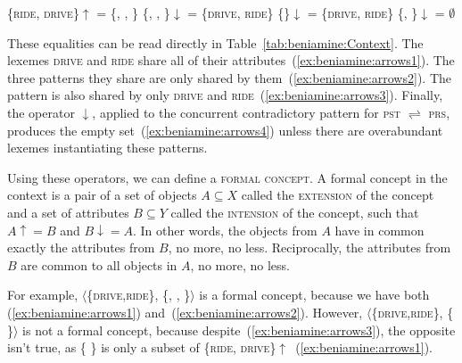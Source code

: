 \documentclass[output=paper]{langscibook}
\begin{document}
    \begin{exe}
        \ex \label{ex:beniamine:arrows1} \{\textsc{ride}, \textsc{drive}\}$\uparrow$ = \{, , \}
        \ex \label{ex:beniamine:arrows2} \{, , \}$\downarrow$ = \{\textsc{drive}, \textsc{ride}\}
        \ex \label{ex:beniamine:arrows3} \{\}$\downarrow$ = \{\textsc{drive}, \textsc{ride}\}
        \ex \label{ex:beniamine:arrows4} \{, \}$\downarrow$ = $\emptyset$
    \end{exe}
    
    These equalities can be read directly in Table~\ref{tab:beniamine:Context}. The lexemes  \textsc{drive} and \textsc{ride} share all of their attributes~(\ref{ex:beniamine:arrows1}). The three patterns they share are only shared by them~(\ref{ex:beniamine:arrows2}). The pattern  is also shared by only \textsc{drive} and \textsc{ride}~(\ref{ex:beniamine:arrows3}). Finally, the operator $\downarrow$, applied to the concurrent contradictory pattern for \textsc{pst} $\rightleftharpoons$ \textsc{prs}, produces the empty set~(\ref{ex:beniamine:arrows4}) unless there are overabundant lexemes instantiating these patterns.
    
    Using these operators, we can define a \textsc{formal concept}. A formal concept in the context \context{} is a pair \concept{} of a set of objects $A \subseteq X$ called the \textsc{extension} of the concept and a set of attributes $B \subseteq Y$ called the \textsc{intension} of the concept, such that $A\uparrow = B$ and $B\downarrow = A$. In other words, the objects from $A$ have in common exactly the attributes from $B$, no more, no less. Reciprocally, the attributes from $B$ are common to all objects in $A$, no more, no less.
    
    \begin{sloppypar}
      For example, $\langle$\{\textsc{drive},\textsc{ride}\},
      \{, ,
       \}$\rangle$ is a formal concept,
      because we have both (\ref{ex:beniamine:arrows1})
      and~(\ref{ex:beniamine:arrows2}). However,
      $\langle$\{\textsc{drive},\textsc{ride}\}, \{ \}$\rangle$ is not a formal concept, because
      despite~(\ref{ex:beniamine:arrows3}), the opposite isn't true,
      as \{ \} is only a subset of
      \{\textsc{ride},
      \textsc{drive}\}$\uparrow$~(\ref{ex:beniamine:arrows1}).
    \end{sloppypar}
    
\end{document}
